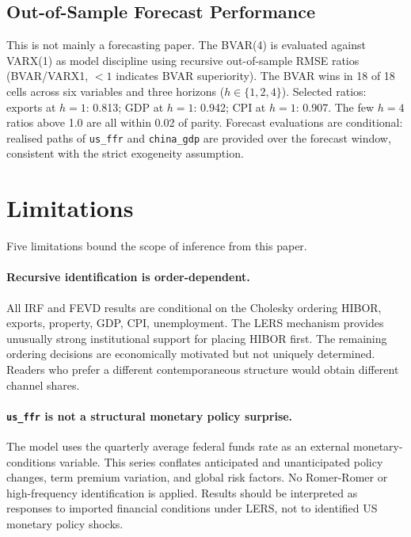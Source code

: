 \documentclass[12pt,a4paper]{article}
\begin{document}
\subsection{Out-of-Sample Forecast Performance}
\label{sec:oos}

This is not mainly a forecasting paper. The BVAR(4) is evaluated against VARX(1)
as model discipline using recursive out-of-sample RMSE ratios (BVAR/VARX1, $< 1$
indicates BVAR superiority). The BVAR wins in 18 of 18 cells across six variables
and three horizons ($h \in \{1, 2, 4\}$). Selected ratios: exports at $h = 1$:
0.813; GDP at $h = 1$: 0.942; CPI at $h = 1$: 0.907. The few $h = 4$ ratios
above 1.0 are all within 0.02 of parity. Forecast evaluations are conditional:
realised paths of \texttt{us\_ffr} and \texttt{china\_gdp} are provided over the
forecast window, consistent with the strict exogeneity assumption.

\section{Limitations}
\label{sec:limitations}

Five limitations bound the scope of inference from this paper.

\paragraph{Recursive identification is order-dependent.}
All IRF and FEVD results are conditional on the Cholesky ordering HIBOR, exports,
property, GDP, CPI, unemployment. The LERS mechanism provides unusually strong
institutional support for placing HIBOR first. The remaining ordering decisions
are economically motivated but not uniquely determined. Readers who prefer a
different contemporaneous structure would obtain different channel shares.

\paragraph{\texttt{us\_ffr} is not a structural monetary policy surprise.}
The model uses the quarterly average federal funds rate as an external
monetary-conditions variable. This series conflates anticipated and unanticipated
policy changes, term premium variation, and global risk factors. No Romer-Romer
or high-frequency identification is applied. Results should be interpreted as
responses to imported financial conditions under LERS, not to identified US
monetary policy shocks.
\end{document}
